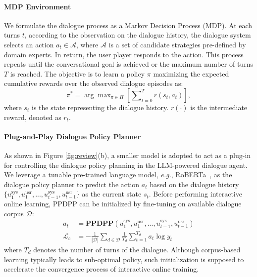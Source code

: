 \documentclass{article} %
\begin{document}
\paragraph{MDP Environment}
We formulate the dialogue process as a Markov Decision Process (MDP). 
At each turns $t$, according to the observation on the dialogue history, the dialogue system selects an action $a_t\in\mathcal{A}$, where $\mathcal{A}$ is a set of candidate strategies pre-defined by domain experts. In return, the user player responds to the action. This process repeats until the conversational goal is achieved or the maximum number of turns $T$ is reached. The objective is to learn a policy $\pi$ maximizing the expected cumulative rewards over the observed dialogue episodes as: 
\begin{equation}
    \pi^* = \arg \max\nolimits_{\pi\in\Pi} \left[\sum\nolimits_{t=0}^T r(s_t,a_t)\right], 
\end{equation}
where $s_t$ is the state representing the dialogue history. $r(\cdot)$ is the intermediate reward, denoted as $r_t$. 

\paragraph{Plug-and-Play Dialogue Policy Planner}
As shown in Figure \ref{fig:review}(b), a smaller model is adopted to act as a plug-in for controlling the dialogue policy planning in the LLM-powered dialogue agent. 
We leverage a tunable pre-trained language model, \textit{e.g.}, RoBERTa~\citep{roberta}, as the dialogue policy planner to predict the action $a_t$ based on the dialogue history $\{u_1^\text{sys}, u_1^\text{usr}, ..., u_{t-1}^\text{sys}, u_{t-1}^\text{usr}\}$ as the current state $s_t$. 
Before performing interactive online learning, PPDPP can be initialized by fine-tuning on available dialogue corpus $\mathcal{D}$: 
\begin{align}
    a_t &= \mathbf{PPDPP}(u_1^\text{sys}, u_1^\text{usr}, ..., u_{t-1}^\text{sys}, u_{t-1}^\text{usr})\\
    \mathcal{L}_c &= -\frac{1}{|\mathcal{D}|}\sum\nolimits_{d\in\mathcal{D}}\frac{1}{T_d}\sum\nolimits_{t=1}^{T_d} a_t\log y_t
\end{align}
where $T_d$ denotes the number of turns of the dialogue. Although corpus-based learning typically leads to sub-optimal policy, such initialization is supposed to accelerate the convergence process of interactive online training. 
\end{document}
